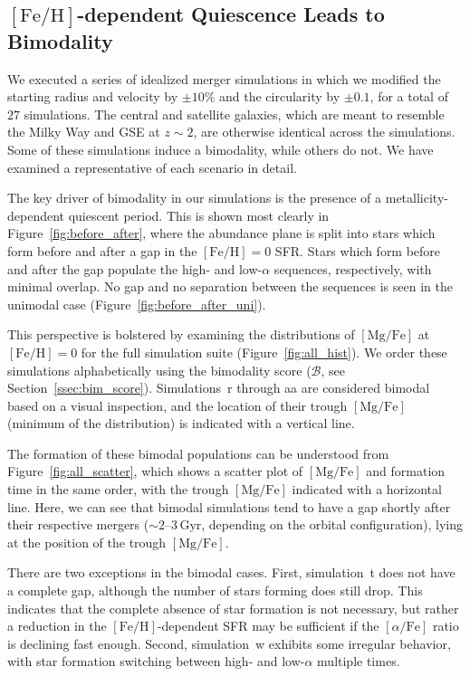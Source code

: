 \documentclass[twocolumn,linenumbers,trackchanges]{aastex631}
\newcommand{\Gyr}{\ensuremath{\textrm{Gyr}}}
\newcommand{\FeH}{\ensuremath{[\textrm{Fe}/\textrm{H}]}}
\newcommand{\MgFe}{\ensuremath{[\textrm{Mg}/\textrm{Fe}]}}
\newcommand{\alphaFe}{\ensuremath{[\alpha/\textrm{Fe}]}}
\begin{document}
\subsection{\FeH{}-dependent Quiescence Leads to Bimodality}\label{ssec:formqui}
We executed a series of idealized merger simulations in which we modified the starting radius and velocity by $\pm10\%$ and the circularity by $\pm0.1$, for a total of $27$ simulations. The central and satellite galaxies, which are meant to resemble the Milky Way and GSE at $z\sim2$, are otherwise identical across the simulations. Some of these simulations induce a bimodality, while others do not. We have examined a representative of each scenario in detail.

The key driver of bimodality in our simulations is the presence of a metallicity-dependent quiescent period. This is shown most clearly in Figure~\ref{fig:before_after}, where the abundance plane is split into stars which form before and after a gap in the $\FeH=0$ SFR. Stars which form before and after the gap populate the high- and low-$\alpha$ sequences, respectively, with minimal overlap. No gap and no separation between the sequences is seen in the unimodal case (Figure~\ref{fig:before_after_uni}).

This perspective is bolstered by examining the distributions of \MgFe{} at $\FeH=0$ for the full simulation suite (Figure~\ref{fig:all_hist}). We order these simulations alphabetically using the bimodality score ($\mathcal{B}$, see Section~\ref{ssec:bim_score}). Simulations~r through aa are considered bimodal based on a visual inspection, and the location of their trough \MgFe{} (minimum of the distribution) is indicated with a vertical line.

The formation of these bimodal populations can be understood from Figure~\ref{fig:all_scatter}, which shows a scatter plot of \MgFe{} and formation time in the same order, with the trough \MgFe{} indicated with a horizontal line. Here, we can see that bimodal simulations tend to have a gap shortly after their respective mergers ($\sim2$--$3\,\Gyr$, depending on the orbital configuration), lying at the position of the trough \MgFe{}.

There are two exceptions in the bimodal cases. First, simulation~t does not have a complete gap, although the number of stars forming does still drop. This indicates that the complete absence of star formation is not necessary, but rather a reduction in the \FeH{}-dependent SFR may be sufficient if the \alphaFe{} ratio is declining fast enough. Second, simulation~w exhibits some irregular behavior, with star formation switching between high- and low-$\alpha$ multiple times.
\end{document}
